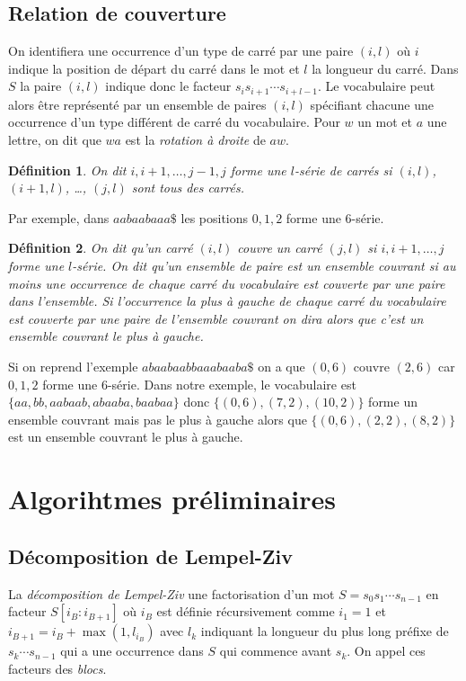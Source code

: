 \documentclass[10pt,letterpaper,oneside]{article}
\newtheorem{definition}{Définition}
\begin{document}
    \subsection{Relation de couverture} \label{sec:couverture}
    On identifiera une occurrence d'un type de carré par une paire $(i,l)$ où $i$ indique la position de départ du carré dans le mot et $l$ la longueur du carré. Dans $S$ la paire $(i,l)$ indique donc le facteur $s_is_{i+1}\cdots s_{i+l-1}$. Le vocabulaire peut alors être représenté par un ensemble de paires $(i,l)$ spécifiant chacune une occurrence d'un type différent de carré du vocabulaire. Pour $w$ un mot et $a$ une lettre, on dit que $wa$ est la \emph{rotation à droite} de $aw$.
    \begin{definition}
        On dit $i,i+1,\dots,j-1,j$ forme une \emph{$l$-série} de carrés si $(i,l)$, $(i+1,l)$, \dots, $(j,l)$ sont tous des carrés.
    \end{definition}
    Par exemple, dans $aabaabaaa\$$ les positions $0,1,2$ forme une $6$-série.
    \begin{definition}
        On dit qu'un carré $(i,l)$ \emph{couvre} un carré $(j,l)$ si $i,i+1,\dots, j$ forme une $l$-série.
        On dit qu'un ensemble de paire est un \emph{ensemble couvrant} si au moins une occurrence de chaque carré du vocabulaire est couverte par une paire dans l'ensemble.
        Si l'occurrence la plus à gauche de chaque carré du vocabulaire est couverte par une paire de l'ensemble couvrant on dira alors que c'est un \emph{ensemble couvrant le plus à gauche}.
    \end{definition}
    Si on reprend l'exemple $abaabaabbaaabaaba\$$ on a que
    $(0,6)$ couvre $(2,6)$ car $0,1,2$ forme une $6$-série.
     Dans notre exemple, le vocabulaire est
    $\{aa,bb,aabaab,abaaba,baabaa\}$
    donc $\{(0,6),(7,2),(10,2)\}$ forme un ensemble couvrant mais pas le plus à gauche alors que
    $\{(0,6),(2,2),(8,2)\}$ est un ensemble couvrant le plus à gauche.
    \section{Algorihtmes préliminaires}
    \subsection{Décomposition de Lempel-Ziv}
    La \emph{décomposition de Lempel-Ziv}  une factorisation d'un mot $S=s_0s_1\cdots  s_{n-1}$ en facteur $S[i_B:i_{B+1}]$ où $i_B$ est définie récursivement comme $i_1=1$ et $i_{B+1}=i_B+\max(1,l_{i_B})$ avec $l_k$ indiquant la longueur du plus long préfixe de $s_k\cdots s_{n-1}$ qui a une occurrence dans $S$ qui commence avant $s_k$. On appel ces facteurs des \emph{blocs}.
\end{document}
